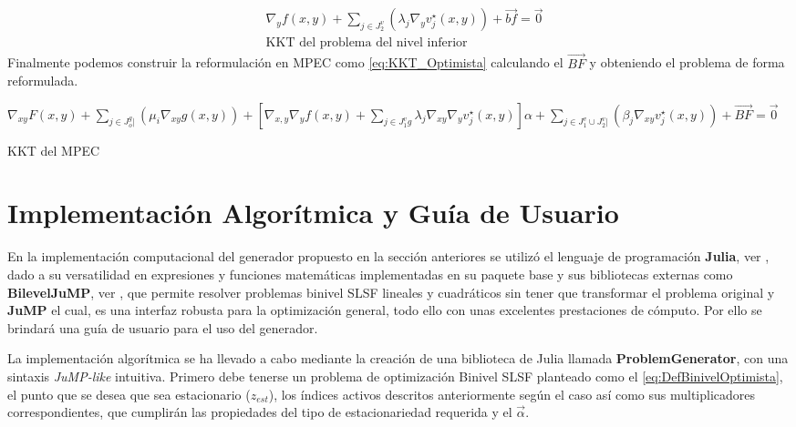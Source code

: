 \begin{equation}
    \begin{aligned}
        &\nabla_{y}f(x,y)+\sum_{j \in J_2^v}(\lambda_j\nabla_{y}v_{j}^{\star}(x,y))+\vec{bf}=\vec{0}\\
        &\text{KKT del problema del nivel inferior}
    \end{aligned}
    \label{KKT_nivel_inferior}
\end{equation}
\linebreak
Finalmente podemos construir la reformulación en MPEC como \ref{eq:KKT_Optimista} calculando el $\vec{BF}$ y 
obteniendo el problema de forma reformulada.
\begin{table}[H]
    \begin{equation}
        \label{KKT_del_MPEC}
    \end{equation}
	$\nabla_{xy}F(x,y)+\sum_{j\in J_o^g|}(\mu_i\nabla_{xy}g(x,y))+[\nabla_{x,y}\nabla_{y}f(x,y)+\sum_{j \in J_1^vg}\lambda_j\nabla_{xy}\nabla_{y}v_{j}^{\star}(x,y)]\alpha+\sum_{j \in J_1^v \cup J_2^v|}(\beta_j\nabla_{xy}v_{j}^{\star}(x,y))+\vec{BF}=\vec{0}$  \label{KKT_del_MPEC}
\caption*{KKT del MPEC}
\end{table}


\section{Implementación Algorítmica y Guía de Usuario}
En la implementación computacional del generador propuesto en la sección anteriores
se utilizó el lenguaje de programación \textbf{Julia}, ver \cite{Juliadocs}, dado a su versatilidad
en expresiones y funciones matemáticas implementadas en su paquete base y sus bibliotecas externas como 
\textbf{BilevelJuMP}, ver \cite{BilevelJump}, que permite resolver problemas binivel SLSF lineales y cuadráticos
sin tener que transformar el problema original y \textbf{JuMP} \cite{JuMPPaper} el cual, es una interfaz robusta para la optimización general,
todo ello con unas excelentes prestaciones de cómputo. Por ello se brindará una guía de usuario para el uso del generador.

La implementación algorítmica se ha llevado a cabo mediante la creación de una biblioteca de Julia
llamada \textbf{ProblemGenerator}, con una sintaxis \textit{JuMP-like} intuitiva.
Primero debe tenerse un problema de optimización Binivel SLSF planteado como el \ref{eq:DefBinivelOptimista}, el punto que se desea que sea estacionario ($z_{est}$), los índices activos descritos anteriormente 
según el caso así como sus multiplicadores correspondientes, que cumplirán las propiedades del tipo de estacionariedad requerida y el $\vec{\alpha}$.

